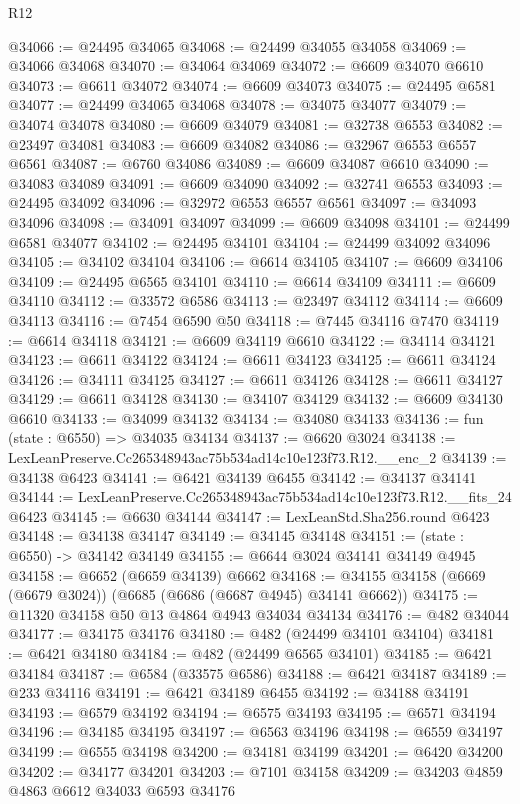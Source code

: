 \begin{lexlean}{R12}
\begin{coremodule}
@34066 := @24495 @34065
@34068 := @24499 @34055 @34058
@34069 := @34066 @34068
@34070 := @34064 @34069
@34072 := @6609 @34070 @6610
@34073 := @6611 @34072
@34074 := @6609 @34073
@34075 := @24495 @6581
@34077 := @24499 @34065 @34068
@34078 := @34075 @34077
@34079 := @34074 @34078
@34080 := @6609 @34079
@34081 := @32738 @6553
@34082 := @23497 @34081
@34083 := @6609 @34082
@34086 := @32967 @6553 @6557 @6561
@34087 := @6760 @34086
@34089 := @6609 @34087 @6610
@34090 := @34083 @34089
@34091 := @6609 @34090
@34092 := @32741 @6553
@34093 := @24495 @34092
@34096 := @32972 @6553 @6557 @6561
@34097 := @34093 @34096
@34098 := @34091 @34097
@34099 := @6609 @34098
@34101 := @24499 @6581 @34077
@34102 := @24495 @34101
@34104 := @24499 @34092 @34096
@34105 := @34102 @34104
@34106 := @6614 @34105
@34107 := @6609 @34106
@34109 := @24495 @6565 @34101
@34110 := @6614 @34109
@34111 := @6609 @34110
@34112 := @33572 @6586
@34113 := @23497 @34112
@34114 := @6609 @34113
@34116 := @7454 @6590 @50
@34118 := @7445 @34116 @7470
@34119 := @6614 @34118
@34121 := @6609 @34119 @6610
@34122 := @34114 @34121
@34123 := @6611 @34122
@34124 := @6611 @34123
@34125 := @6611 @34124
@34126 := @34111 @34125
@34127 := @6611 @34126
@34128 := @6611 @34127
@34129 := @6611 @34128
@34130 := @34107 @34129
@34132 := @6609 @34130 @6610
@34133 := @34099 @34132
@34134 := @34080 @34133
@34136 := fun (state : @6550) => @34035 @34134
@34137 := @6620 @3024
@34138 := LexLeanPreserve.Cc265348943ac75b534ad14c10e123f73.R12.__enc_2
@34139 := @34138 @6423
@34141 := @6421 @34139 @6455
@34142 := @34137 @34141
@34144 := LexLeanPreserve.Cc265348943ac75b534ad14c10e123f73.R12.__fits_24 @6423
@34145 := @6630 @34144
@34147 := LexLeanStd.Sha256.round @6423
@34148 := @34138 @34147
@34149 := @34145 @34148
@34151 := (state : @6550) -> @34142 @34149
@34155 := @6644 @3024 @34141 @34149 @4945
@34158 := @6652 (@6659 @34139) @6662
@34168 := @34155 @34158 (@6669 (@6679 @3024)) (@6685 (@6686 (@6687 @4945) @34141 @6662))
@34175 := @11320 @34158 @50 @13 @4864 @4943 @34034 @34134
@34176 := @482 @34044
@34177 := @34175 @34176
@34180 := @482 (@24499 @34101 @34104)
@34181 := @6421 @34180
@34184 := @482 (@24499 @6565 @34101)
@34185 := @6421 @34184
@34187 := @6584 (@33575 @6586)
@34188 := @6421 @34187
@34189 := @233 @34116
@34191 := @6421 @34189 @6455
@34192 := @34188 @34191
@34193 := @6579 @34192
@34194 := @6575 @34193
@34195 := @6571 @34194
@34196 := @34185 @34195
@34197 := @6563 @34196
@34198 := @6559 @34197
@34199 := @6555 @34198
@34200 := @34181 @34199
@34201 := @6420 @34200
@34202 := @34177 @34201
@34203 := @7101 @34158
@34209 := @34203 @4859 @4863 @6612 @34033 @6593 @34176

\end{coremodule}
\end{lexlean}
